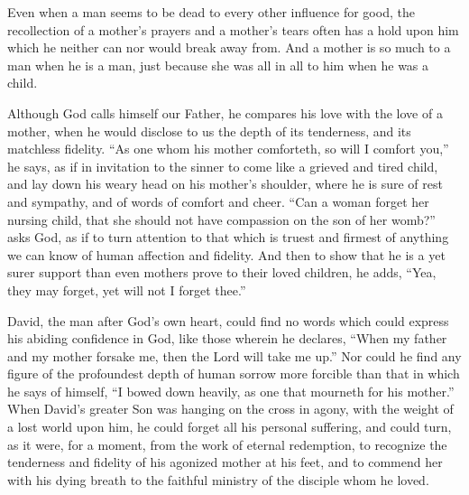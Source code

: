 \documentclass[
]{book}
\begin{document}
Even when a man seems to be dead to every other influence for good, the recollection of a mother's prayers and a mother's tears often has a hold upon him which he neither can nor would break away from. And a mother is so much to a man when he is a man, just because she was all in all to him when he was a child.

Although God calls himself our Father, he compares his love with the love of a mother, when he would disclose to us the depth of its tenderness, and its matchless fidelity. ``As one whom his mother comforteth, so will I comfort you,'' he says, as if in invitation to the sinner to come like a grieved and tired child, and lay down his weary head on his mother's shoulder, where he is sure of rest and sympathy, and of words of comfort and cheer. ``Can a woman forget her nursing child, that she should not have compassion on the son of her womb?'' asks God, as if to turn attention to that which is truest and firmest of anything we can know of human affection and fidelity. And then to show that he is a yet surer support than even mothers prove to their loved children, he adds, ``Yea, they may forget, yet will not I forget thee.''

David, the man after God's own heart, could find no words which could express his abiding confidence in God, like those wherein he declares, ``When my father and my mother forsake me, then the Lord will take me up.'' Nor could he find any figure of the profoundest depth of human sorrow more forcible than that in which he says of himself, ``I bowed down heavily, as one that mourneth for his mother.'' When David's greater Son was hanging on the cross in agony, with the weight of a lost world upon him, he could forget all his personal suffering, and could turn, as it were, for a moment, from the work of eternal redemption, to recognize the tenderness and fidelity of his agonized mother at his feet, and to commend her with his dying breath to the faithful ministry of the disciple whom he loved.
\end{document}
